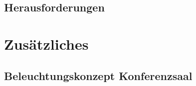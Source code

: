 \documentclass[
    headings=optiontotocandhead,%
    twoside,
    numbers=noenddot,%
    toc=flat, %
    12pt, %
    titlepage, %
    parskip=full, %
    listof=totoc, %
    listof=flat, %
    numbers=noenddot, %
    bibliography=totoc, %
    a4paper,DIV=14,
    BCOR=15mm,
]{scrbook}
\begin{document}
\renewcommand{\kapitelautor}{Autor: Dominik Nußbaumer}

    

\section{Herausforderungen}\label{Herausforderungen}

\renewcommand{\kapitelautor}{Autor: Dominik Nußbaumer}

    

\chapter{Zusätzliches}\label{Zusätzliches}



% 

\section{Beleuchtungskonzept Konferenzsaal}\label{Beleuchtungskonzept-Konferenzsaal}

\renewcommand{\kapitelautor}{Autor: Florian Steiner}







\end{document}
